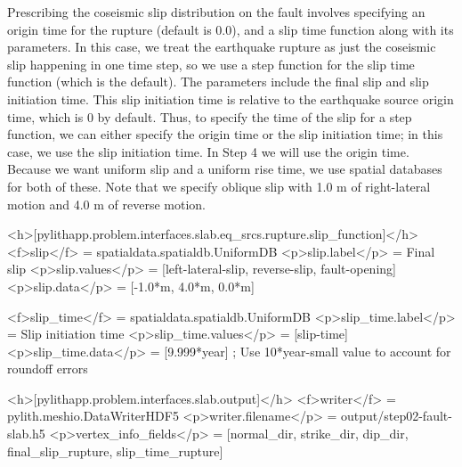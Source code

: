 Prescribing the coseismic slip distribution on the fault involves
specifying an origin time for the rupture (default is 0.0), and a slip
time function along with its parameters. In this case, we treat the
earthquake rupture as just the coseismic slip happening in one time
step, so we use a step function for the slip time function (which is
the default). The parameters include the final slip and slip
initiation time. This slip initiation time is relative to the
earthquake source origin time, which is 0 by default. Thus, to specify
the time of the slip for a step function, we can either specify the
origin time or the slip initiation time; in this case, we use the slip
initiation time. In Step 4 we will use the origin time. Because we
want uniform slip and a uniform rise time, we use 
spatial databases for both of these. Note that we specify oblique slip
with 1.0 m of right-lateral motion and 4.0 m of reverse motion.
\begin{cfg}
<h>[pylithapp.problem.interfaces.slab.eq_srcs.rupture.slip_function]</h>
<f>slip</f> = spatialdata.spatialdb.UniformDB
<p>slip.label</p> = Final slip
<p>slip.values</p> = [left-lateral-slip, reverse-slip, fault-opening]
<p>slip.data</p> = [-1.0*m, 4.0*m, 0.0*m] 

<f>slip_time</f> = spatialdata.spatialdb.UniformDB
<p>slip_time.label</p>  = Slip initiation time
<p>slip_time.values</p> = [slip-time]
<p>slip_time.data</p> = [9.999*year] ; Use 10*year-small value to account for roundoff errors

<h>[pylithapp.problem.interfaces.slab.output]</h>
<f>writer</f> = pylith.meshio.DataWriterHDF5
<p>writer.filename</p> = output/step02-fault-slab.h5
<p>vertex_info_fields</p> = [normal_dir, strike_dir, dip_dir, final_slip_rupture, slip_time_rupture]
\end{cfg}

